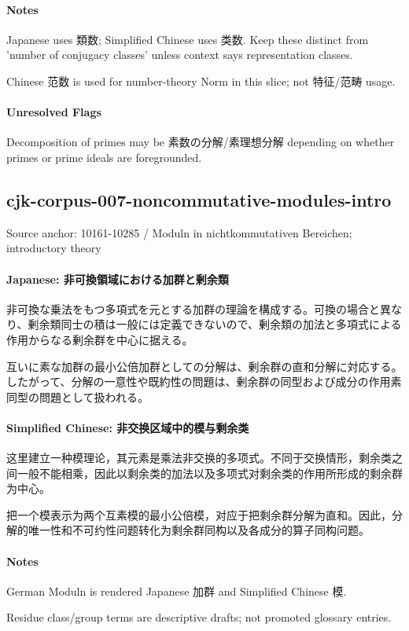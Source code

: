\documentclass[11pt]{article}
\begin{document}
\paragraph{Notes}
Japanese uses 類数; Simplified Chinese uses 类数. Keep these distinct from 'number of conjugacy classes' unless context says representation classes.\par
Chinese 范数 is used for number-theory Norm in this slice; not 特征/范畴 usage.\par
\paragraph{Unresolved Flags}
Decomposition of primes may be 素数の分解/素理想分解 depending on whether primes or prime ideals are foregrounded.\par
\subsection*{cjk-corpus-007-noncommutative-modules-intro}
Source anchor: 10161-10285 / Moduln in nichtkommutativen Bereichen; introductory theory
\par
\paragraph{Japanese: 非可換領域における加群と剰余類}
非可換な乗法をもつ多項式を元とする加群の理論を構成する。可換の場合と異なり、剰余類同士の積は一般には定義できないので、剰余類の加法と多項式による作用からなる剰余群を中心に据える。\par
互いに素な加群の最小公倍加群としての分解は、剰余群の直和分解に対応する。したがって、分解の一意性や既約性の問題は、剰余群の同型および成分の作用素同型の問題として扱われる。\par
\paragraph{Simplified Chinese: 非交换区域中的模与剩余类}
这里建立一种模理论，其元素是乘法非交换的多项式。不同于交换情形，剩余类之间一般不能相乘，因此以剩余类的加法以及多项式对剩余类的作用所形成的剩余群为中心。\par
把一个模表示为两个互素模的最小公倍模，对应于把剩余群分解为直和。因此，分解的唯一性和不可约性问题转化为剩余群同构以及各成分的算子同构问题。\par
\paragraph{Notes}
German Moduln is rendered Japanese 加群 and Simplified Chinese 模.\par
Residue class/group terms are descriptive drafts; not promoted glossary entries.\par
\end{document}
